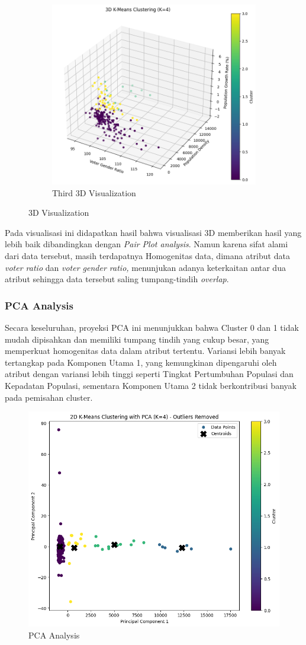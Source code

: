 \begin{figure}[h]
\begin{subfigure}{0.5\textwidth}
\end{subfigure}
\begin{subfigure}{1\textwidth}
    \centering
    \includegraphics[width=0.5\linewidth]{images/third_3d_visual.png}
    \caption{Third 3D Visualization}
    \label{fig:third_3d_visual}
\end{subfigure}

    \caption{3D Visualization}
    \label{fig:3d_visual}

\end{figure}

Pada visualisasi ini didapatkan hasil bahwa visualisasi 3D memberikan hasil yang lebih baik dibandingkan dengan \textit{Pair Plot analysis}. Namun karena sifat alami dari data tersebut, masih terdapatnya Homogenitas data, dimana atribut data \textit{voter ratio} dan \textit{voter gender ratio, } menunjukan adanya keterkaitan antar dua atribut sehingga data tersebut saling tumpang-tindih \textit{overlap}.

\subsubsection{PCA Analysis}
Secara keseluruhan, proyeksi PCA ini menunjukkan bahwa Cluster 0 dan 1 tidak mudah dipisahkan dan memiliki tumpang tindih yang cukup besar, yang memperkuat homogenitas data dalam atribut tertentu. Variansi lebih banyak tertangkap pada Komponen Utama 1, yang kemungkinan dipengaruhi oleh atribut dengan variansi lebih tinggi seperti Tingkat Pertumbuhan Populasi dan Kepadatan Populasi, sementara Komponen Utama 2 tidak berkontribusi banyak pada pemisahan cluster.
\begin{figure}[H]
    \centering
    \includegraphics[width=0.5\linewidth]{images/pca_visual.png}
    \caption{PCA Analysis}
    \label{fig:pca_analysis}

\end{figure}
\newpage

